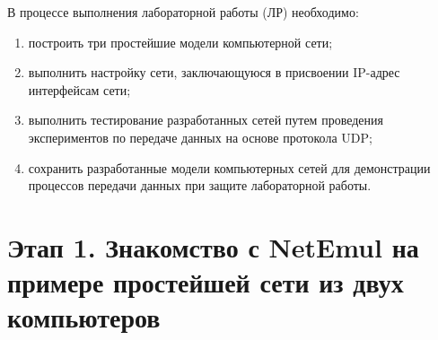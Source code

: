 \documentclass[12pt,onecolumn]{article}
\begin{document}
В процессе выполнения лабораторной работы (ЛР) необходимо:

\begin{enumerate}
    \item построить три простейшие модели компьютерной сети;
    \item выполнить настройку сети, заключающуюся в присвоении IP-адрес интерфейсам сети;
    \item выполнить тестирование разработанных сетей путем проведения экспериментов по передаче данных на основе протокола UDP;
    \item сохранить разработанные модели компьютерных сетей для демонстрации процессов передачи данных при защите лабораторной работы.
\end{enumerate}

\section{Этап 1. Знакомство с NetEmul на примере простейшей сети из двух компьютеров}
\end{document}
